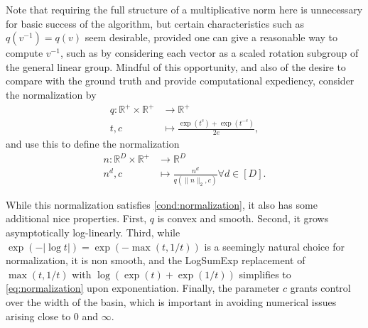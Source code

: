 Note that requiring the full structure of a multiplicative norm here is unnecessary for basic success of the algorithm, but certain characteristics such as $q(v^{-1}) = q(v)$ seem desirable, provided one can give a reasonable way to compute $v^{-1}$, such as by considering each vector as a scaled rotation subgroup of the general linear group.
Mindful of this opportunity, and also of the desire to compare with the ground truth and provide computational expediency, consider the normalization by
\begin{align}
\label{eq:normalization}
q: \mathbb R^+ \times \mathbb R^+  &\to \mathbb R^+ \\
t , c &\mapsto \frac{\exp(t^c) + \exp(t^{-c})}{2e},
\end{align}
and use this to define the normalization 
\begin{align}
n: \mathbb R^D \times \mathbb R^+ &\to \mathbb R^D \\
n^d , c &\mapsto \frac{n^d}{q(\|n\|_{2},c) } \forall d \in [D].
\end{align}

While this normalization satisfies \ref{cond:normalization}, it also has some additional nice properties.
First, $q$ is convex and smooth.
Second, it grows asymptotically log-linearly.
Third, while $\exp(-|\log t|) = \exp(-\max (t, 1/t))$ is a seemingly natural choice for normalization, it is non smooth, and the LogSumExp replacement of $\max (t, 1/t)$ with $ \log (\exp (t ) + \exp(1/t))$ simplifies to \ref{eq:normalization} upon exponentiation.
Finally, the parameter $c$ grants control over the width of the basin, which is important in avoiding numerical issues arising close to $0$ and $\infty$.


